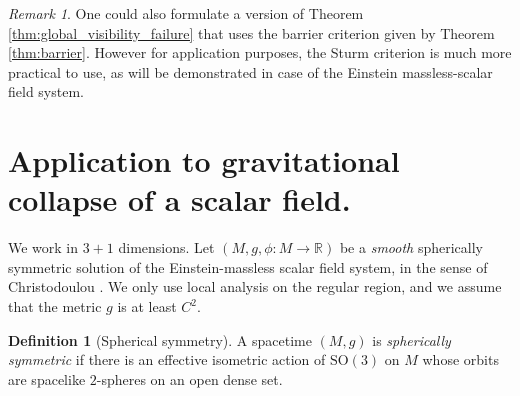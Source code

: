 \documentclass[a4paper, reqno]{amsart}
\numberwithin{equation}{section}
\theoremstyle{plain}
\theoremstyle{definition}
\newtheorem{definition}[theorem]{Definition}
\theoremstyle{remark}
\newtheorem{remark}[theorem]{Remark}
\begin{document}
\begin{remark}
    One could also formulate a version of Theorem \ref{thm:global_visibility_failure} that uses the barrier criterion given by Theorem \ref{thm:barrier}. However for application purposes, the Sturm criterion is much more practical to use, as will be demonstrated in case of the Einstein massless-scalar field system.
\end{remark}
    

\section{Application to gravitational collapse of a scalar field.}

We work in $3+1$ dimensions. Let $( M,g,\phi:M\to \mathbb{R})$ be a \emph{smooth} spherically symmetric solution of the Einstein-massless scalar field system, in the sense of Christodoulou \cite{Christodoulou1994,Christodoulou1999}. We only use local analysis on the
regular region, and we assume that the metric $g$ is at least $C^2$.

\begin{definition}[Spherical symmetry]\label{def:spherical}
A spacetime $(M,g)$ is \emph{spherically symmetric} if there is an effective isometric
action of $\mathrm{SO}(3)$ on $M$ whose orbits are spacelike $2$-spheres on an open dense set.
\end{definition}
\end{document}
